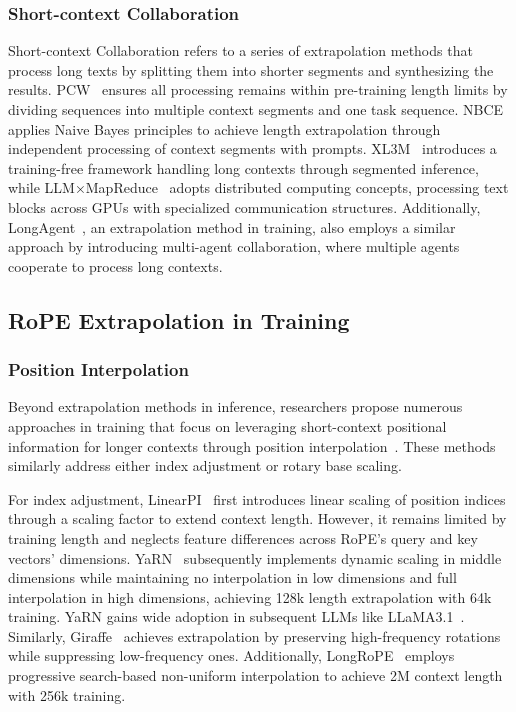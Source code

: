 \subsubsection{Short-context Collaboration}
Short-context Collaboration refers to a series of extrapolation methods that process long texts by splitting them into shorter segments and synthesizing the results. PCW~\citep{ratner2022parallel} ensures all processing remains within pre-training length limits by dividing sequences into multiple context segments and one task sequence. NBCE~\citep{kexuefm9617} applies Naive Bayes principles to achieve length extrapolation through independent processing of context segments with prompts. XL3M~\citep{wang2024xl3m} introduces a training-free framework handling long contexts through segmented inference, while LLM×MapReduce~\citep{zhou2024llm} adopts distributed computing concepts, processing text blocks across GPUs with specialized communication structures. Additionally, LongAgent~\citep{zhao2024longagent}, an extrapolation method in training, also employs a similar approach by introducing multi-agent collaboration, where multiple agents cooperate to process long contexts.

\subsection{RoPE Extrapolation in Training}\label{sec2_3}

\subsubsection{Position Interpolation}
Beyond extrapolation methods in inference, researchers propose numerous approaches in training that focus on leveraging short-context positional information for longer contexts through position interpolation~\citep{liuscaling, xiong2024effective}. These methods similarly address either index adjustment or rotary base scaling.

For index adjustment, LinearPI~\citep{chen2023extending} first introduces linear scaling of position indices through a scaling factor to extend context length. However, it remains limited by training length and neglects feature differences across RoPE's query and key vectors' dimensions. YaRN~\citep{pengyarn} subsequently implements dynamic scaling in middle dimensions while maintaining no interpolation in low dimensions and full interpolation in high dimensions, achieving 128k length extrapolation with 64k training. YaRN gains wide adoption in subsequent LLMs like LLaMA3.1~\citep{dubey2024llama}. Similarly, Giraffe~\citep{pal2023giraffe} achieves extrapolation by preserving high-frequency rotations while suppressing low-frequency ones. Additionally, LongRoPE~\citep{ding2024longrope} employs progressive search-based non-uniform interpolation to achieve 2M context length with 256k training.

